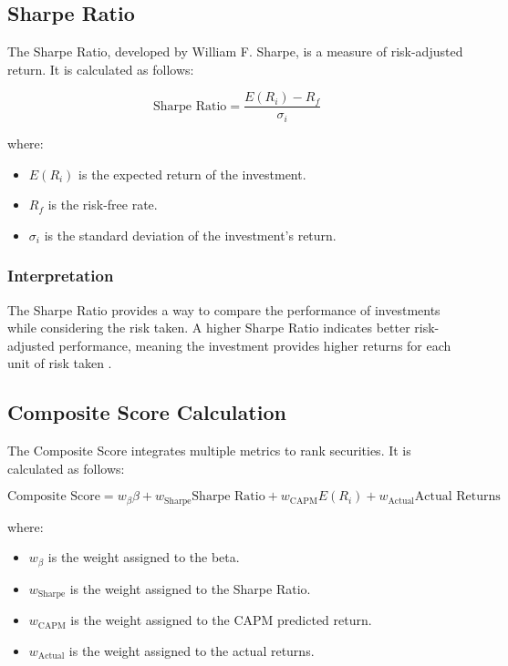 \subsection{Sharpe Ratio}
The Sharpe Ratio, developed by William F. Sharpe, is a measure of risk-adjusted return. It is calculated as follows:

\begin{equation}
\text{Sharpe Ratio} = \frac{E(R_i) - R_f}{\sigma_i}
\end{equation}

where:
\begin{itemize}
    \item $E(R_i)$ is the expected return of the investment.
    \item $R_f$ is the risk-free rate.
    \item $\sigma_i$ is the standard deviation of the investment's return.
\end{itemize}

\subsubsection{Interpretation}
The Sharpe Ratio provides a way to compare the performance of investments while considering the risk taken. A higher Sharpe Ratio indicates better risk-adjusted performance, meaning the investment provides higher returns for each unit of risk taken \citep{sharpe1966mutual}.

\subsection{Composite Score Calculation}
The Composite Score integrates multiple metrics to rank securities. It is calculated as follows:

\begin{equation}
\text{Composite Score} = w_{\beta} \beta + w_{\text{Sharpe}} \text{Sharpe Ratio} + w_{\text{CAPM}} E(R_i) + w_{\text{Actual}} \text{Actual Returns}
\end{equation}

where:
\begin{itemize}
    \item $w_{\beta}$ is the weight assigned to the beta.
    \item $w_{\text{Sharpe}}$ is the weight assigned to the Sharpe Ratio.
    \item $w_{\text{CAPM}}$ is the weight assigned to the CAPM predicted return.
    \item $w_{\text{Actual}}$ is the weight assigned to the actual returns.
\end{itemize}

